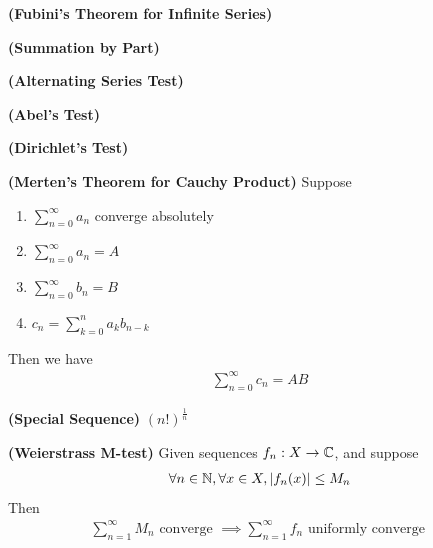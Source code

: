 \documentclass{report}
\begin{document}
\begin{theorem}
\textbf{(Fubini's Theorem for Infinite Series)}
\end{theorem}
\begin{mdframed}

\end{mdframed}
\begin{theorem}
\textbf{(Summation by Part)}
\end{theorem}
\begin{mdframed}

\end{mdframed}
\begin{theorem}
\textbf{(Alternating Series Test)}
\end{theorem}
\begin{theorem}
\textbf{(Abel's Test)}
\end{theorem}
\begin{theorem}
\textbf{(Dirichlet's Test)}
\end{theorem}
\begin{mdframed}

\end{mdframed}
\begin{theorem}
\label{Merten Cau}
\textbf{(Merten's Theorem for Cauchy Product)} Suppose 
\begin{enumerate}[label=(\alph*)]
  \item $\sum_{n=0}^\infty a_n$ converge absolutely 
  \item $\sum_{n=0}^\infty a_n=A$
  \item $\sum_{n=0}^\infty b_n=B$ 
  \item $c_n=\sum_{k=0}^n a_kb_{n-k}$
\end{enumerate}
Then we have 
\begin{align*}
\sum_{n=0}^{\infty}c_n=AB
\end{align*}
\end{theorem}
\begin{mdframed}

\end{mdframed}
\begin{theorem}
\textbf{(Special Sequence)} $(n!)^{\frac{1}{n}}$
\end{theorem}
\begin{theorem}
\label{WM-t}
\textbf{(Weierstrass M-test)} Given sequences $f_n:X\rightarrow \mathbb{C}$, and suppose 
\begin{align}
\label{K9}
\forall n\in\mathbb{N},\forall x\in X, \left|f_n(x)\right|\leq M_n
\end{align}
Then 
\begin{align*}
\sum_{n=1}^\infty M_n\text{ converge }\implies \sum_{n=1}^\infty f_n\text{ uniformly converge }
\end{align*} 
\end{theorem}
\end{document}
